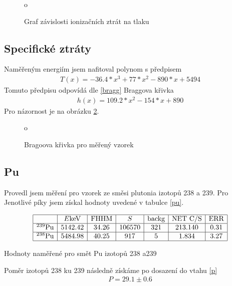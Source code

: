 \documentclass[a4paper,12pt]{article}
\begin{document}
\begin{figure}
\begin{center}
o
\end{center}
\caption{Graf závislosti ionizačních ztrát na tlaku}
\label{g}
\end{figure}



\subsection{Specifické ztráty}
Naměřeným energiím jsem nafitoval polynom s předpisem
\begin{eqnarray}
T(x)=-36.4*x^3+77*x^2-890*x+5494
\end{eqnarray}
Tomuto předpisu odpovídá dle \ref{bragg} Braggova křivka
\begin{eqnarray}
h(x)=109.2*x^2-154*x+890
\end{eqnarray}
Pro názornost je na obrázku \ref{o1}.

\begin{figure}
\begin{center}
o
\end{center}
\caption{Bragoova křivka pro měřený vzorek}
\label{o1}
\end{figure}

\subsection{Pu}
Provedl jsem měření pro vzorek ze směsi plutonia izotopů 238 a 239. Pro Jenotlivé píky jsem získal hodnoty uvedené  v tabulce \ref{pu}.

\begin{table}
$$
\begin{array}{|c|c|c|c|c|c|c|}
\hline
&E\mbox{keV}&\mbox{FHHM}&S&\mbox{backg}&\mbox{NET C/S}& \mbox{ERR}\\ \hline
^{239}\mbox{Pu}&5142.42&34.26&106570&321&213.140&0.31\\ \hline
^{238}\mbox{Pu}&5484.98&40.25&917&5&1.834&3.27\\ \hline
\end{array}
$$
\caption{Hodnoty naměřené pro smět Pu izotopů 238 a239}
\label{pu}
\end{table}

Poměr izotopů 238 ku 239 následně získáme po dosazení do vtahu \ref{p}
\begin{eqnarray}
P=29.1 \pm 0.6
\end{eqnarray}
\end{document}
